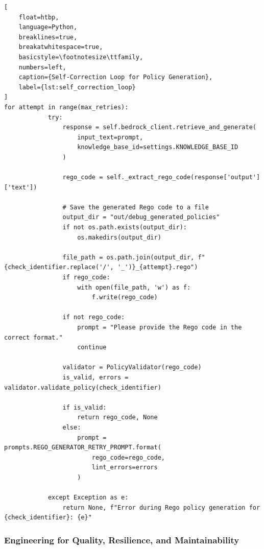 \begin{lstlisting}[
    float=htbp,
    language=Python, 
    breaklines=true, 
    breakatwhitespace=true,
    basicstyle=\footnotesize\ttfamily, 
    numbers=left,
    caption={Self-Correction Loop for Policy Generation},
    label={lst:self_correction_loop}
]
for attempt in range(max_retries):
            try:
                response = self.bedrock_client.retrieve_and_generate(
                    input_text=prompt,
                    knowledge_base_id=settings.KNOWLEDGE_BASE_ID
                )

                rego_code = self._extract_rego_code(response['output']['text'])

                # Save the generated Rego code to a file
                output_dir = "out/debug_generated_policies"
                if not os.path.exists(output_dir):
                    os.makedirs(output_dir)
                
                file_path = os.path.join(output_dir, f"{check_identifier.replace('/', '_')}_{attempt}.rego")
                if rego_code:
                    with open(file_path, 'w') as f:
                        f.write(rego_code)

                if not rego_code:
                    prompt = "Please provide the Rego code in the correct format."
                    continue

                validator = PolicyValidator(rego_code)
                is_valid, errors = validator.validate_policy(check_identifier)

                if is_valid:
                    return rego_code, None
                else:
                    prompt = prompts.REGO_GENERATOR_RETRY_PROMPT.format(
                        rego_code=rego_code,
                        lint_errors=errors
                    )

            except Exception as e:
                return None, f"Error during Rego policy generation for {check_identifier}: {e}"
\end{lstlisting}

\subsubsection{Engineering for Quality, Resilience, and Maintainability}

